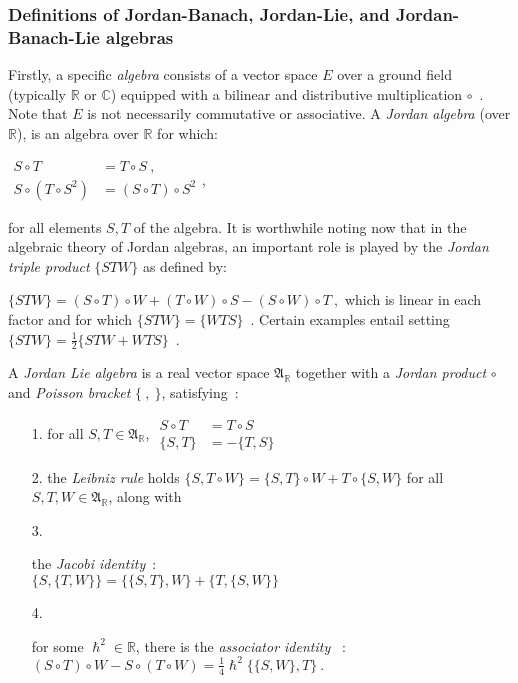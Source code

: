 \documentclass[12pt]{article}
\theoremstyle{plain}
\theoremstyle{definition}
\numberwithin{equation}{section}
\newcommand{\bC}{\mathbb{C}}
\newcommand{\bR}{\mathbb{R}}
\newcommand{\med}{\medbreak}
\begin{document}
\subsubsection{Definitions of Jordan-Banach, Jordan-Lie, and Jordan-Banach-Lie algebras}

Firstly, a specific \emph{algebra} consists of a vector space $E$ over a ground field (typically $\bR$ or $\bC$) 
equipped with a bilinear and distributive multiplication $\circ$~. Note that $E$ is not 
necessarily commutative or associative.
\med
A \emph{Jordan algebra} (over $\bR$), is an algebra over $\bR$ for which:
\med 

$ \begin{aligned} S \circ T &= T \circ S~, \\ S \circ (T \circ S^2) &= (S \circ T) \circ S^2 
\end{aligned}$, 


\med
for all elements $S, T$ of the algebra.
\med
It is worthwhile noting now that in the algebraic theory of Jordan algebras, an important 
role is played by the \emph{Jordan triple product} $\{STW\}$ as defined by:

$ \{STW\} = (S \circ T)\circ W + (T \circ W) \circ S - (S \circ W) \circ T~, $
\med
which is linear in each factor and for which $\{STW\} = \{WTS\}$~. Certain examples entail 
setting $\{STW\} = \frac{1}{2}\{STW + WTS\}$~.

\med

 A \emph{Jordan Lie algebra} is a real vector space $\mathfrak A_{\bR}$
 together with a \emph{Jordan product} $\circ$ and \emph{Poisson bracket}
\bigbreak
 $\{~,~\}$, satisfying~:
 \begin{itemize}
\item[1.] for all $S, T \in \mathfrak A_{\bR}$,
$\begin{aligned} S \circ T &= T \circ S \\ \{S, T \} &= - \{T,
S\} \end{aligned}$
\med

\item[2.] the \emph{Leibniz rule} holds
\bigbreak
$ \{S, T \circ W \} = \{S, T\} \circ W + T \circ \{S, W\}$ 
for all $S, T, W \in \mathfrak A_{\bR}$, along with



\med

\item[3.]

the \emph{Jacobi identity}~:\\

 $ \{S, \{T, W \}\} = \{\{S,T \}, W\} + \{T, \{S, W \}\}$



\med

\item[4.]

for some $\hslash^2 \in \bR$, there is the \emph{associator identity} ~:
\bigbreak 
$(S \circ T) \circ W - S \circ (T \circ W) = \frac{1}{4} \hslash^2 \{\{S, W \}, T \}~.$



\end{itemize}
\end{document}
